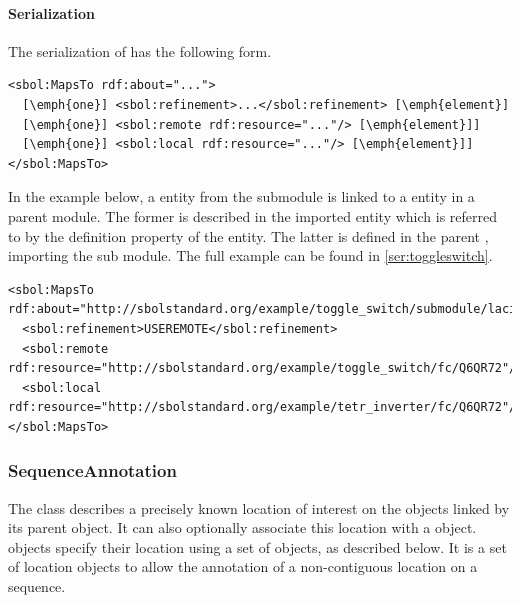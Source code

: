 
\paragraph{Serialization}
The serialization of  has the following form.
\begin{lstlisting}
<sbol:MapsTo rdf:about="...">
  [\emph{one}] <sbol:refinement>...</sbol:refinement> [\emph{element}]
  [\emph{one}] <sbol:remote rdf:resource="..."/> [\emph{element}]]
  [\emph{one}] <sbol:local rdf:resource="..."/> [\emph{element}]]
</sbol:MapsTo>
\end{lstlisting}

In the example below, a  entity from the submodule is linked to a  entity in a parent module. The former is described in the imported  entity which is referred to by the definition property of the  entity. The latter is defined in the parent , importing the sub module. The full example can be found in \ref{ser:toggleswitch}.
\begin{lstlisting}
<sbol:MapsTo rdf:about="http://sbolstandard.org/example/toggle_switch/submodule/laci_inverter/mapping/Q6QR72">
  <sbol:refinement>USEREMOTE</sbol:refinement>
  <sbol:remote rdf:resource="http://sbolstandard.org/example/toggle_switch/fc/Q6QR72"/>
  <sbol:local rdf:resource="http://sbolstandard.org/example/tetr_inverter/fc/Q6QR72"/>
</sbol:MapsTo>
\end{lstlisting}


\subsubsection{SequenceAnnotation}
\label{sec:SequenceAnnotation}
The  class describes a precisely known location of interest on the  objects linked by its parent  object.  It can also optionally associate this location with a  object.  objects specify their location using a set of   objects, as described below.  It is a set of location objects to allow the annotation of a non-contiguous location on a sequence.


